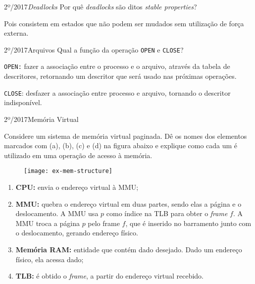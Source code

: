\begin{exercicio}
  {2º/2017}{\textit{Deadlocks}}
  {Por quê \textit{deadlocks} são ditos \textit{stable properties}?}

  Pois consistem em estados que não podem ser mudados sem utilização de força externa.
\end{exercicio}

\begin{exercicio}
  {2º/2017}{Arquivos}
  {Qual a função da operação \texttt{OPEN} e \texttt{CLOSE}?}

  \texttt{OPEN:} fazer a associação entre o processo e o arquivo, através da tabela de descritores, retornando um descritor que será usado nas próximas operações.

  \texttt{CLOSE}: desfazer a associação entre processo e arquivo, tornando o descritor indisponível.
\end{exercicio}

\begin{exercicio}
  {2º/2017}{Memória Virtual}
  {
    Considere um sistema de memória virtual paginada. Dê os nomes dos elementos marcados com (a), (b), (c) e (d) na figura abaixo e explique como cada um é utilizado em uma operação de acesso à memória.
    \begin{figure}[H]
      \centering
      \texttt{[image: ex-mem-structure]}
    \end{figure}
  }

  \begin{enumerate}[label=(\alph*)]
    \item \textbf{CPU:} envia o endereço virtual à MMU;

    \item \textbf{MMU:} quebra o endereço virtual em duas partes, sendo elas a página e o deslocamento. A MMU usa $p$ como índice na TLB para obter o \textit{frame} $f$. A MMU troca a página $p$ pelo frame $f$, que é inserido no barramento junto com o deslocamento, gerando endereço físico.

    \item \textbf{Memória RAM:} entidade que contém dado desejado. Dado um endereço físico, ela acessa dado;

    \item \textbf{TLB:} é obtido o \textit{frame}, a partir do endereço virtual recebido.
  \end{enumerate}
\end{exercicio}


